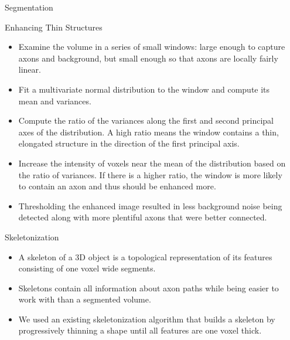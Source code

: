 \documentclass[final]{beamer}
\newlength{\colwidth}
\newlength{\columnseparation}
\begin{document}
\begin{frame}[t]
\begin{columns}[t]
\begin{column}{\colwidth}
\begin{block}{Segmentation}
\begin{alertblock}{Enhancing Thin Structures}
\begin{itemize}
	\item Examine the volume in a series of small windows: large enough to capture axons and background, but small enough so that axons are locally fairly linear.
	\item Fit a multivariate normal distribution to the window and compute its mean and variances.
	\item Compute the ratio of the variances along the first and second principal axes of the distribution. A high ratio means the window contains a thin, elongated structure in the direction of the first principal axis.
	\item Increase the intensity of voxels near the mean of the distribution based on the ratio of variances. If there is a higher ratio, the window is more likely to contain an axon and thus should be enhanced more.
\end{itemize}

\end{alertblock}
\vspace{-1cm}
\begin{itemize}
	\item Thresholding the enhanced image resulted in less background noise being detected along with more plentiful axons that were better connected.
\end{itemize}

\end{block}
\begin{block}{Skeletonization}

\begin{itemize}
	\item A skeleton of a 3D object is a topological representation of its features consisting of one voxel wide segments.
	\item Skeletons contain all information about axon paths while being easier to work with than a segmented volume.
	\item We used an existing skeletonization algorithm \cite{skeletonization} that builds a skeleton by progressively thinning a shape until all features are one voxel thick.
\end{itemize}

\end{block}

\end{column} %

\begin{column}{\columnseparation}\end{column} %


\end{columns}
\end{frame}
\end{document}

